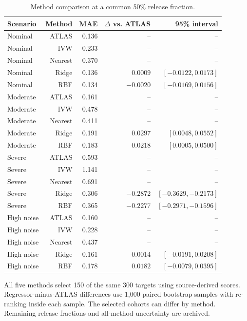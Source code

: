 \begin{table}[htbp]
\centering\small
\setlength{\tabcolsep}{4pt}
\caption{Method comparison at a common 50\% release fraction.}
\label{tab:b-selection}
\begin{tabular}{lrrrr}
\toprule
Scenario & Method & MAE & $\Delta$ vs. ATLAS & 95\% interval \\
\midrule
Nominal & ATLAS & 0.136 & -- & -- \\
Nominal & IVW & 0.233 & -- & -- \\
Nominal & Nearest & 0.370 & -- & -- \\
Nominal & Ridge & 0.136 & $0.0009$ & $[-0.0122, 0.0173]$ \\
Nominal & RBF & 0.134 & $-0.0020$ & $[-0.0169, 0.0156]$ \\
Moderate & ATLAS & 0.161 & -- & -- \\
Moderate & IVW & 0.478 & -- & -- \\
Moderate & Nearest & 0.411 & -- & -- \\
Moderate & Ridge & 0.191 & $0.0297$ & $[0.0048, 0.0552]$ \\
Moderate & RBF & 0.183 & $0.0218$ & $[0.0005, 0.0500]$ \\
Severe & ATLAS & 0.593 & -- & -- \\
Severe & IVW & 1.141 & -- & -- \\
Severe & Nearest & 0.691 & -- & -- \\
Severe & Ridge & 0.306 & $-0.2872$ & $[-0.3629, -0.2173]$ \\
Severe & RBF & 0.365 & $-0.2277$ & $[-0.2971, -0.1596]$ \\
High noise & ATLAS & 0.160 & -- & -- \\
High noise & IVW & 0.228 & -- & -- \\
High noise & Nearest & 0.437 & -- & -- \\
High noise & Ridge & 0.161 & $0.0014$ & $[-0.0191, 0.0208]$ \\
High noise & RBF & 0.178 & $0.0182$ & $[-0.0079, 0.0395]$ \\
\bottomrule
\end{tabular}
\par\smallskip\begin{minipage}{0.97\linewidth}\footnotesize All five methods select 150 of the same 300 targets using source-derived scores. Regressor-minus-ATLAS differences use 1,000 paired bootstrap samples with re-ranking inside each sample. The selected cohorts can differ by method. Remaining release fractions and all-method uncertainty are archived.\end{minipage}
\end{table}
